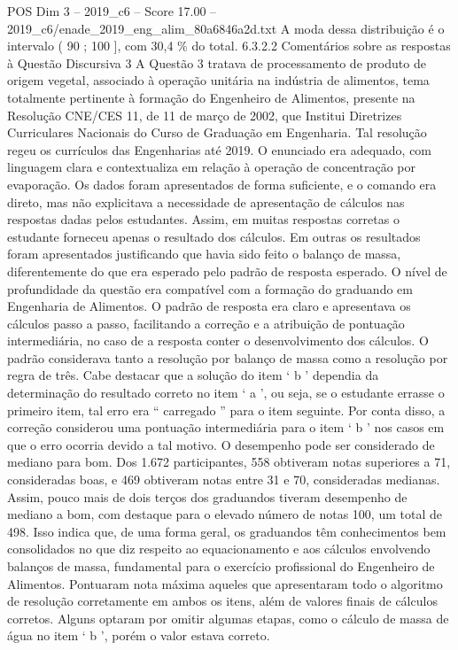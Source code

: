 \begin{textsample}{POS Dim 3 – 2019\_c6 – Score 17.00 – 2019\_c6/enade\_2019\_eng\_alim\_80a6846a2d.txt}
A moda dessa distribuição é o intervalo ( 90 ; 100 ], com 30,4 \% do total. 6.3.2.2 Comentários sobre as respostas à Questão Discursiva 3 A Questão 3 tratava de processamento de produto de origem vegetal, associado à operação unitária na indústria de alimentos, tema totalmente pertinente à formação do Engenheiro de Alimentos, presente na Resolução CNE/CES 11, de 11 de março de 2002, que Institui Diretrizes Curriculares Nacionais do Curso de Graduação em Engenharia.
Tal resolução regeu os currículos das Engenharias até 2019.
O enunciado era adequado, com linguagem clara e contextualiza em relação à operação de concentração por evaporação.
Os dados foram apresentados de forma suficiente, e o comando era direto, mas não explicitava a necessidade de apresentação de cálculos nas respostas dadas pelos estudantes.
Assim, em muitas respostas corretas o estudante forneceu apenas o resultado dos cálculos.
Em outras os resultados foram apresentados justificando que havia sido feito o balanço de massa, diferentemente do que era esperado pelo padrão de resposta esperado.
O nível de profundidade da questão era compatível com a formação do graduando em Engenharia de Alimentos.
O padrão de resposta era claro e apresentava os cálculos passo a passo, facilitando a correção e a atribuição de pontuação intermediária, no caso de a resposta conter o desenvolvimento dos cálculos.
O padrão considerava tanto a resolução por balanço de massa como a resolução por regra de três.
Cabe destacar que a solução do item ‘ b ’ dependia da determinação do resultado correto no item ‘ a ’, ou seja, se o estudante errasse o primeiro item, tal erro era “ carregado ” para o item seguinte.
Por conta disso, a correção considerou uma pontuação intermediária para o item ‘ b ’ nos casos em que o erro ocorria devido a tal motivo.
O desempenho pode ser considerado de mediano para bom.
Dos 1.672 participantes, 558 obtiveram notas superiores a 71, consideradas boas, e 469 obtiveram notas entre 31 e 70, consideradas medianas.
Assim, pouco mais de dois terços dos graduandos tiveram desempenho de mediano a bom, com destaque para o elevado número de notas 100, um total de 498.
Isso indica que, de uma forma geral, os graduandos têm conhecimentos bem consolidados no que diz respeito ao equacionamento e aos cálculos envolvendo balanços de massa, fundamental para o exercício profissional do Engenheiro de Alimentos.
Pontuaram nota máxima aqueles que apresentaram todo o algoritmo de resolução corretamente em ambos os itens, além de valores finais de cálculos corretos.
Alguns optaram por omitir algumas etapas, como o cálculo de massa de água no item ‘ b ’, porém o valor estava correto.

\end{textsample}
